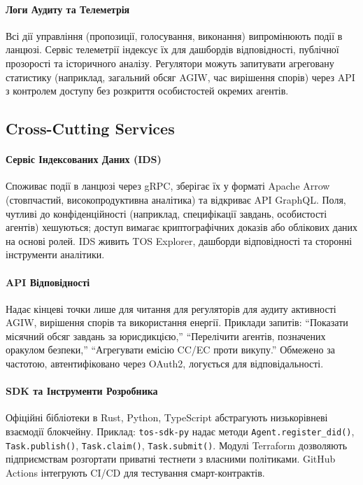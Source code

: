 \documentclass[11pt]{article}
\begin{document}
\paragraph{Логи Аудиту та Телеметрія} Всі дії управління (пропозиції, голосування, виконання) випромінюють події в ланцюзі. Сервіс телеметрії індексує їх для дашбордів відповідності, публічної прозорості та історичного аналізу. Регулятори можуть запитувати агреговану статистику (наприклад, загальний обсяг AGIW, час вирішення спорів) через API з контролем доступу без розкриття особистостей окремих агентів.

\subsection{Cross-Cutting Services}
\paragraph{Сервіс Індексованих Даних (IDS)} Споживає події в ланцюзі через gRPC, зберігає їх у форматі Apache Arrow (стовпчастий, високопродуктивна аналітика) та відкриває API GraphQL. Поля, чутливі до конфіденційності (наприклад, специфікації завдань, особистості агентів) хешуються; доступ вимагає криптографічних доказів або облікових даних на основі ролей. IDS живить TOS Explorer, дашборди відповідності та сторонні інструменти аналітики.

\paragraph{API Відповідності} Надає кінцеві точки лише для читання для регуляторів для аудиту активності AGIW, вирішення спорів та використання енергії. Приклади запитів: ``Показати місячний обсяг завдань за юрисдикцією,'' ``Перелічити агентів, позначених оракулом безпеки,'' ``Агрегувати емісію CC/EC проти викупу.'' Обмежено за частотою, автентифіковано через OAuth2, логується для відповідальності.

\paragraph{SDK та Інструменти Розробника} Офіційні бібліотеки в Rust, Python, TypeScript абстрагують низькорівневі взаємодії блокчейну. Приклад: \texttt{tos-sdk-py} надає методи \texttt{Agent.register\_did()}, \texttt{Task.publish()}, \texttt{Task.claim()}, \texttt{Task.submit()}. Модулі Terraform дозволяють підприємствам розгортати приватні тестнети з власними політиками. GitHub Actions інтегрують CI/CD для тестування смарт-контрактів.
\end{document}
